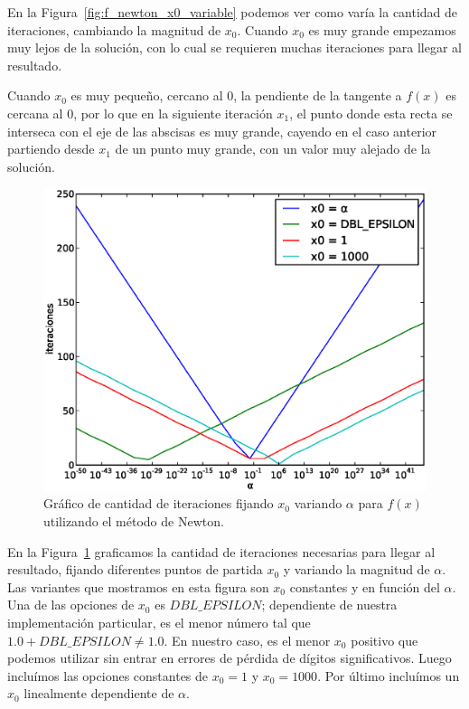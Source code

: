 En la Figura~\ref{fig:f_newton_x0_variable}  podemos ver como varía la cantidad
de iteraciones, cambiando la magnitud de $x_0$. Cuando $x_0$ es muy grande
empezamos muy lejos de la solución, con lo cual se requieren muchas iteraciones
para llegar al resultado.

Cuando $x_0$ es muy pequeño, cercano al $0$, la pendiente de la tangente a
$f(x)$ es cercana al 0, por lo que en la siguiente iteración $x_1$, el punto donde
esta recta se interseca con el eje de las abscisas es muy grande, cayendo en el
caso anterior partiendo desde $x_1$ de un punto muy grande, con un valor muy
alejado de la solución.

\begin{figure}[!htbp]
  \begin{center}
    \includegraphics[scale=0.5]{graficos/new/f_newton_x0_fijo_1.eps}
    \caption{\label{fig:f_newton_x0_fijo_1} Gráfico de cantidad de iteraciones fijando $x_0$ variando $\alpha$ para $f(x)$ utilizando el método de Newton.}
  \end{center}
\end{figure}

En la Figura~\ref{fig:f_newton_x0_fijo_1} graficamos la cantidad de iteraciones
necesarias para llegar al resultado, fijando diferentes puntos de partida $x_0$
y variando la magnitud de $\alpha$. Las variantes que mostramos en esta figura
son $x_0$ constantes y en función del $\alpha$. Una de las opciones de $x_0$ es
$\textit{DBL\_EPSILON}$; dependiente de nuestra implementación particular, es
el menor número tal que $1.0 + \textit{DBL\_EPSILON} \ne 1.0$. En nuestro caso,
es el menor $x_0$ positivo que podemos utilizar sin entrar en errores de
pérdida de dígitos significativos. Luego incluímos las opciones constantes de
$x_0 = 1$ y $x_0 = 1000$. Por último incluímos un $x_0$ linealmente dependiente
de $\alpha$.

